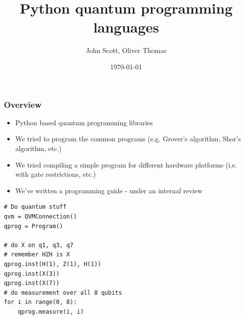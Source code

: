 \documentclass{beamer}
\title{Python quantum programming languages}
\author{John Scott, Oliver Thomas}
\institute{Quantum Engineering CDT \\ University of Bristol}
\date{\today}
\begin{document}
\frame{\titlepage}

\begin{frame}[fragile]
\frametitle{Overview}
\begin{minipage}{0.52\textwidth}
\begin{itemize}
    \item Python based quantum programming libraries
    \item We tried to program the common programs (e.g. Grover's algorithm, Shor's algorithm, etc.)
    \item We tried compiling a simple program for different hardware platforms (i.e. with gate restrictions, etc.)
    \item We've written a programming guide - under an internal review
\end{itemize}
\end{minipage} \hfill
%
\begin{minipage}{0.44\textwidth}
 \begin{verbatim}
# Do quantum stuff  
qvm = QVMConnection() 
qprog = Program() 

# do X on q1, q3, q7 
# remember HZH is X 
qprog.inst(H(1), Z(1), H(1)) 
qprog.inst(X(3)) 
qprog.inst(X(7)) 
# do measurement over all 8 qubits 
for i in range(0, 8): 
    qprog.measure(i, i) 
  \end{verbatim}
  \end{minipage}
\end{frame}
\end{document}
